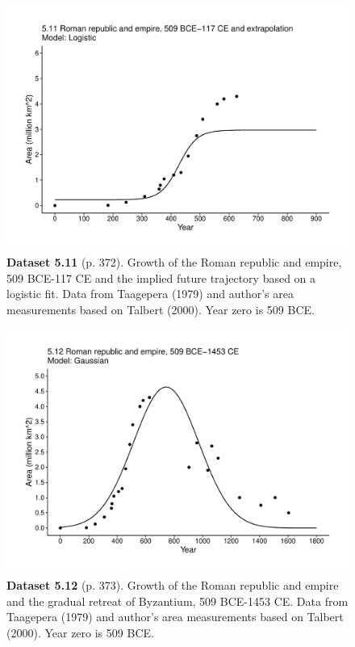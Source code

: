 \documentclass[aps,rmp,preprint,superscriptaddress,10pt,onecolumn]{article}
\begin{document}
\clearpage
\begin{figure}[h]
\includegraphics[width=\textwidth]{output/figs-ggplot/5.11.pdf}
\caption*{\textbf{Dataset 5.11} (p. 372). Growth of the Roman republic and empire, 509 BCE-117 CE and the implied future trajectory based on a logistic fit. Data from Taagepera (1979) and author's area measurements based on Talbert (2000). Year zero is 509 BCE. }
\end{figure}
	
\clearpage
\begin{figure}[h]
\includegraphics[width=\textwidth]{output/figs-ggplot/5.12.pdf}
\caption*{\textbf{Dataset 5.12} (p. 373). Growth of the Roman republic and empire and the gradual retreat of Byzantium, 509 BCE-1453 CE. Data from Taagepera (1979) and author's area measurements based on Talbert (2000). Year zero is 509 BCE. }
\end{figure}
	
\end{document}
